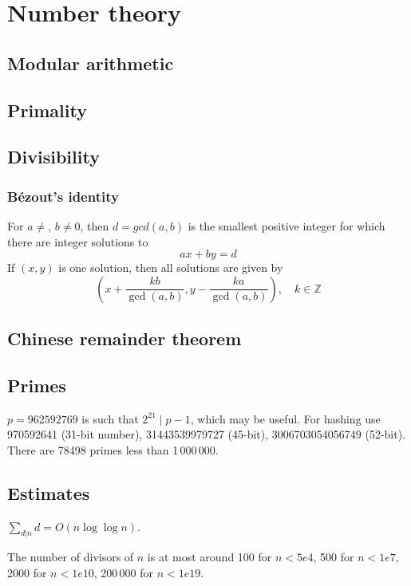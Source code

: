 
\chapter{Number theory}

	\section{Modular arithmetic}

	\section{Primality}

	\section{Divisibility}
		\subsection{Bézout's identity}
		For $a \neq $, $b \neq 0$, then $d=gcd(a,b)$ is the smallest positive integer for which there are integer solutions to
		$$ax+by=d$$
		If $(x,y)$ is one solution, then all solutions are given by
		$$\left(x+\frac{kb}{\gcd(a,b)}, y-\frac{ka}{\gcd(a,b)}\right), \quad k\in\mathbb{Z}$$


	\section{Chinese remainder theorem}

	\section{Primes}
		$p=962592769$ is such that $2^{21} \mid p-1$, which may be useful. For hashing
		use 970592641 (31-bit number), 31443539979727 (45-bit), 3006703054056749
		(52-bit). There are 78498 primes less than 1\,000\,000.

	\section{Estimates}
		$\sum_{d|n} d = O(n \log \log n)$.

		The number of divisors of $n$ is at most around 100 for $n < 5e4$, 500 for $n < 1e7$, 2000 for $n < 1e10$, 200\,000 for $n < 1e19$.
